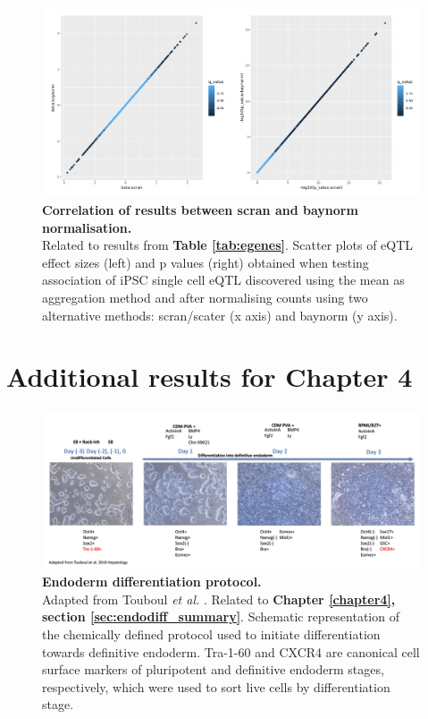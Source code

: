 \begin{figure}[h]
    \centering
    \includegraphics[width=16cm]{Appendix2/Fig/suppl_scran_vs_baynorm.png}
    \caption[Correlation of results between scran and baynorm normalisation]{\textbf{Correlation of results between scran and baynorm normalisation.}\\
    Related to results from \textbf{Table \ref{tab:egenes}}.
    Scatter plots of eQTL effect sizes (left) and p values (right) obtained when testing association of iPSC single cell eQTL discovered using the mean as aggregation method and after normalising counts using two alternative methods: scran/scater \cite{mccarthy2017scater} (x axis) and baynorm \cite{tang2020baynorm} (y axis).}
    \label{suppl_fig:scran_vs_baynorm}
\end{figure}

\clearpage

\section{Additional results for Chapter 4}

\begin{figure}[h]
    \centering
    \includegraphics[width=16cm]{Appendix2/Fig/suppl_protocol.png}
    \caption[Endoderm differentiation protocol]{\textbf{Endoderm differentiation protocol.}\\
    Adapted from Touboul \textit{et al.} \cite{touboul2010generation}.
    Related to \textbf{Chapter \ref{chapter4}, section \ref{sec:endodiff_summary}}.
    Schematic representation of the chemically defined protocol used to initiate differentiation towards  definitive endoderm. 
    Tra-1-60 and CXCR4 are canonical cell surface markers of pluripotent and definitive endoderm stages, respectively, which were used to sort live cells by differentiation stage. }
    \label{suppl_fig:endodiff_exp_protocol}
\end{figure}

